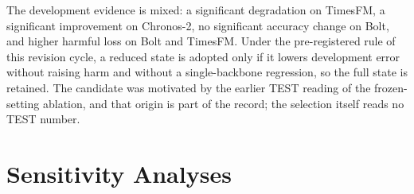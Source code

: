 \documentclass{article}
\begin{document}
\begin{table}[htbp]
\centering\small
\caption{Evaluation of the two state representations, each under its own selected
$(k,\beta)$. DEV is the TRAIN-eval block on which selection-side evidence is legitimate;
TEST is the previously examined evaluation block, recorded here for completeness only.
HIR is conditional on an intervention. The paired difference is FULL minus RED on
source-macro MASE, so a negative value favours FULL.}
\label{tab:v53-compact}
\end{table}

The development evidence is mixed: a significant degradation on TimesFM, a significant
improvement on Chronos-2, no significant accuracy change on Bolt, and higher harmful loss
on Bolt and TimesFM. Under the pre-registered rule of this revision cycle, a reduced state
is adopted only if it lowers development error without raising harm and without a
single-backbone regression, so the full state is retained. The candidate was motivated by
the earlier TEST reading of the frozen-setting ablation, and that origin is part of the
record; the selection itself reads no TEST number.

\section{Sensitivity Analyses}
\end{document}
